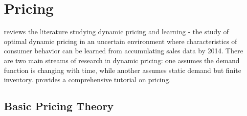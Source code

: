 \documentclass[10pt]{report}
\begin{document}
\clearpage
\section{Pricing}

\cite{den2015dynamic} reviews the literature studying dynamic pricing and learning - the study of optimal dynamic pricing in an uncertain environment where characteristics of consumer behavior can be learned from accumulating sales data by 2014. There are two main streams of research in dynamic pricing: one assumes the demand function is changing with time, while another assumes static demand but finite inventory. \cite{ozer2012oxford} provides a comprehensive tutorial on pricing.

\subsection{Basic Pricing Theory}
\end{document}
